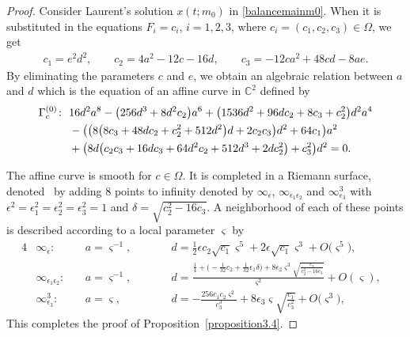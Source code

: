 \documentclass[10pt,a4paper]{amsart}
\numberwithin{equation}{section}
\begin{document}
\begin{proof}
 Consider Laurent's solution $x(t;m_0)$ in \eqref{balancemainm0}.
 When it is substituted in the equations $F_i=c_i$, $i=1,2,3$, where $c_i=(c_1,c_2,c_3)\in \Omega$, we get
\begin{gather*}
 c_1 = e^2d^2, \qquad
 c_2 = 4a^2-12c-16d, \qquad
 c_3 = -12ca^2+48cd-8ae.
\end{gather*}
By eliminating the parameters $c$ and $e$, we obtain an algebraic
relation between $a$ and $d$ which is the equation of an affine
curve in $\mathbb{C}^2$ defined by
\begin{gather*}
\begin{split}
& \Gamma_c^{(0)}\colon \ 16d^2a^8-\bigl(256d^3+8d^2c_2\bigr)a^6+\bigl(1536d^2+96dc_2+8c_3+c_2^2\bigr)d^2a^4\\
&\hphantom{\Gamma_c^{(0)}\colon} \ {} -\bigl(\bigl(8\bigl(8c_3+48dc_2+c_2^2+512d^2\bigr)d+2c_2c_3\bigr)d^2+64c_1\bigr)a^2\\
& \hphantom{\Gamma_c^{(0)}\colon} \ {} +\bigl(8d\bigl(c_2c_3+16dc_3+64d^2c_2 +512d^3+2dc_2^2\bigr)+c_3^2\bigr)d^2=0.
\end{split}
\end{gather*}

The affine curve  is smooth for $c\in
\Omega$. It is completed in a Riemann surface, denoted~ by adding $8$ points to
infinity denoted by $\infty_{\epsilon}$,
$\infty_{\epsilon_1\epsilon_2}$ and $\infty^3_{\epsilon_3}$ with
$\epsilon^2=\epsilon_1^2=\epsilon_2^2=\epsilon_3^2=1$ and
$\delta=\sqrt{c_2^2-16c_3}$. A neighborhood of each of these points
is described according to a local parameter $\varsigma$ by
\begin{alignat}{4}
& \infty_{\epsilon}\colon \ && a =\varsigma^{-1},\qquad && d
=\frac{1}{2}\epsilon c_2\sqrt{c_1}\varsigma^5+
2\epsilon\sqrt{c_1}\varsigma^3 + O\bigl(\varsigma^5\bigr), &\label{valeurde_inftyvarepsilon_D0}\\
& \infty_{\epsilon_1\epsilon_2}\colon \ && a =\varsigma^{-1},\qquad && d
=\frac{\frac{1}{4}+\bigl(-\frac{1}{32}c_2+\frac{1}{32}\epsilon_1\delta\bigr)
+8\epsilon_2\varsigma^3\sqrt{\frac{c_1}{c_2^2-16c_3}}}{\varsigma^2}+O(\varsigma), &\label{valeurde_inftyvarepsilon1epsilon2_D0}\\
& \infty^3_{\epsilon_3}\colon \ && a =\varsigma,\qquad && d
=-\frac{256c_1c_2\varsigma^2}{c_3^3}+8\epsilon_3\varsigma\sqrt{\frac{c_1}{c_3^2}}+O\bigl(\varsigma^3\bigr), &\label{valeurde_inftyvarepsilon3_D0}
\end{alignat}
This completes the proof of Proposition~\ref{proposition3.4}.
\end{proof}
\end{document}
